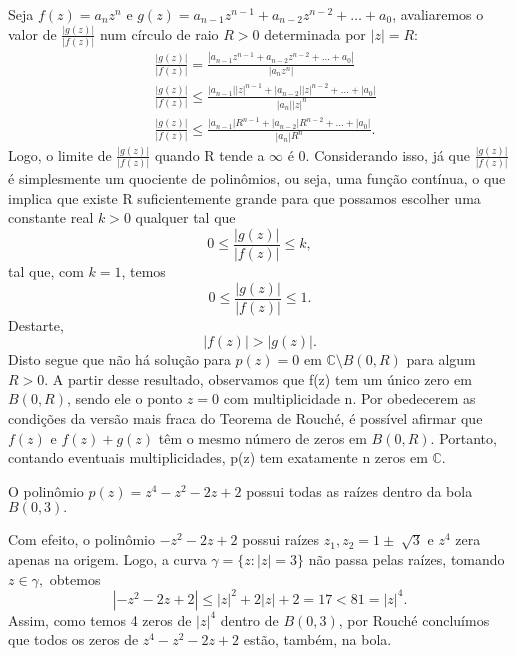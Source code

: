\documentclass[complex.tex]{subfiles}
\begin{document}
\begin{proof*}
	Seja \(f(z) = a_{n}z^{n}\) e \(g(z) = a_{n-1}z^{n-1}+a_{n-2}z^{n-2}+\dotsc +a_{0}\), avaliaremos o valor de \(\frac{|g(z)|}{|f(z)|}\) num círculo de raio \(R > 0\) determinada por \(|z| = R:\)
	\begin{align*}
		 & \frac{|g(z)|}{|f(z)|} = \frac{|a_{n-1}z^{n-1} + a_{n-2}z^{n-2}+\dotsc +a_{0}|}{|a_{n}z^{n}|}              \\
		 & \frac{|g(z)|}{|f(z)|} \leq \frac{|a_{n-1}||z|^{n-1} + |a_{n-2}||z|^{n-2}+\dotsc +|a_{0}|}{|a_{n}||z|^{n}} \\
		 & \frac{|g(z)|}{|f(z)|} \leq \frac{|a_{n-1}|R^{n-1}+|a_{n-2}|R^{n-2}+\dotsc +|a_{0}|}{|a_{n}|R^{n}}.
	\end{align*}
	Logo, o limite de \(\frac{|g(z)|}{|f(z)|}\) quando R tende a \(\infty\) é 0. Considerando isso, já que \(\frac{|g(z)|}{|f(z)|}\) é simplesmente um quociente de polinômios, ou seja,
	uma função contínua, o que implica que existe R suficientemente grande para que possamos escolher uma constante real \(k > 0\) qualquer tal que
	\[
		0\leq \frac{|g(z)|}{|f(z)|}\leq k,
	\]
	tal que, com \(k=1\), temos
	\[
		0 \leq \frac{|g(z)|}{|f(z)|}\leq 1.
	\]
	Destarte,
	\[
		|f(z)| > |g(z)|.
	\]
	Disto segue que não há solução para \(p(z) = 0\) em \(\mathbb{C}\setminus{B(0, R)}\) para algum \(R > 0.\) A partir desse resultado, observamos que f(z) tem um único zero em \(B(0, R)\), sendo ele o ponto
	\(z=0\) com multiplicidade n. Por obedecerem as condições da versão mais fraca do Teorema de Rouché, é possível afirmar que \(f(z)\) e \(f(z) + g(z)\) têm o mesmo número de zeros em \(B(0, R)\). Portanto,
	contando eventuais multiplicidades, p(z) tem exatamente n zeros em \(\mathbb{C}.\) \qedsymbol
\end{proof*}
\begin{example}
	O polinômio \(p(z) = z^{4} - z^{2} - 2z + 2\) possui todas as raízes dentro da bola \(B(0, 3).\)

	Com efeito, o polinômio \(-z^{2} - 2z + 2\) possui raízes \(z_{1}, z_{2} = 1\pm \sqrt[]{3}\) e \(z^{4}\) zera apenas na origem. Logo, a curva \(\gamma  = \{z: |z| = 3\}\) não passa pelas raízes, tomando
	\(z\in \gamma ,\) obtemos
	\[
		|-z^{2} - 2z + 2| \leq |z|^{2} + 2|z| + 2 = 17 < 81 = |z|^{4}.
	\]
	Assim, como temos 4 zeros de \(|z|^{4}\) dentro de \(B(0, 3)\), por Rouché concluímos que todos os zeros de \(z^{4}-z^{2}-2z + 2\) estão, também, na bola.
\end{example}
\end{document}
